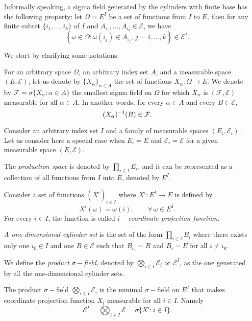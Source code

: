 Informally speaking, a sigma field generated by the cylinders with finite base has the following property: let $\Omega = E^I$ be a set of functions from $I$ to $E$, then for any finite subset $\{i_1,\ldots,i_k\}$ of $I$ and $A_{i_1}, \ldots, A_{i_k} \in \mathcal{E}$, we have 
$$
	\left\{\omega \in \Omega : \omega(i_j) \in A_{i_j}, \, j=1,\ldots,k \right\} \in \mathcal{E}^I.
$$

We start by clarifying some notations. 

\begin{definition}
For an arbitrary space $\Omega$, an arbitrary index set $A$, and a measurable space  $(E,\mathcal{E})$, let us denote by $\{X_\alpha\}_{\alpha \in A}$ the set of functions $X_\alpha : \Omega \to E$. We denote by $\mathcal{F} = \sigma\{X_\alpha: \alpha \in A\}$ the smallest sigma field on $\Omega$ for which $X_\alpha$ is $(\mathcal{F}, \mathcal{E})$ measurable for all $\alpha \in A$. In another words, for every $\alpha \in A$ and every $B\in \mathcal{E}$, 
$$
	(X_\alpha)^{-1}(B) \in {\cal F}.
$$
\end{definition}


\begin{definition} Consider an arbitrary index set $I$ and a family of measurable spaces $(E_i, \mathcal{E}_i)$. Let us consider here a special case when $E_i = E$ and $\mathcal{E}_i = \mathcal{E}$ for a given measurable space $(E, \mathcal{E})$. 
	
The \textit{production space} is denoted by $\prod_{i\in I} E_i$, and it can be represented as a collection of all functions from $I$ into $E$, denoted by $E^I$. 
	
Consider a set of functions $(X^i)_{i\in I}$ where $X^i: E^I \to E$ is defined by 
$$
	X^i(\omega) = \omega(i),\qquad \forall \, \omega \in E^I.
$$
For every $i\in I$, the function is called \textit{$i-$coordinate projection function}.
 
\textit{A one-dimensional cylinder set} is the set of the form $\prod_{i \in I} B_i$ where there exists only one $i_0 \in I$ and one $B \in \mathcal{E}$ such that $B_{i_0} = B$ and $B_i = E$ for all $i \neq i_0$. 

We define the \textit{product $\sigma-$field}, denoted by $\bigotimes_{i \in I}\mathcal{E}_i$ or $\mathcal{E}^I$, as the one generated by all the one-dimensional cylinder sets.
\end{definition}

\begin{lemma}
The product $\sigma-$field $\bigotimes_{i \in I} \mathcal{E}_i$ is the minimal $\sigma-$field on $E^I$ that makes coordinate projection function $X_i$ measurable for all $i \in I$. Namely
$$
	\mathcal{E}^I = \bigotimes_{i\in I} \mathcal{E} = \sigma\{ X^i:  i \in I \}.
$$
\end{lemma}

